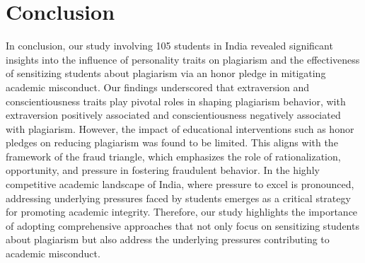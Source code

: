 \section{Conclusion}
\label{sec:conclusion}

In conclusion, our study involving 105 students in India revealed significant insights into the influence of personality traits on plagiarism and the effectiveness of sensitizing students about plagiarism via an honor pledge in mitigating academic misconduct. Our findings underscored that extraversion and conscientiousness traits play pivotal roles in shaping plagiarism behavior, with extraversion positively associated and conscientiousness negatively associated with plagiarism. However, the impact of educational interventions such as honor pledges on reducing plagiarism was found to be limited. This aligns with the framework of the fraud triangle, which emphasizes the role of rationalization, opportunity, and pressure in fostering fraudulent behavior. In the highly competitive academic landscape of India, where pressure to excel is pronounced, addressing underlying pressures faced by students emerges as a critical strategy for promoting academic integrity. Therefore, our study highlights the importance of adopting comprehensive approaches that not only focus on sensitizing students about plagiarism but also address the underlying pressures contributing to academic misconduct.